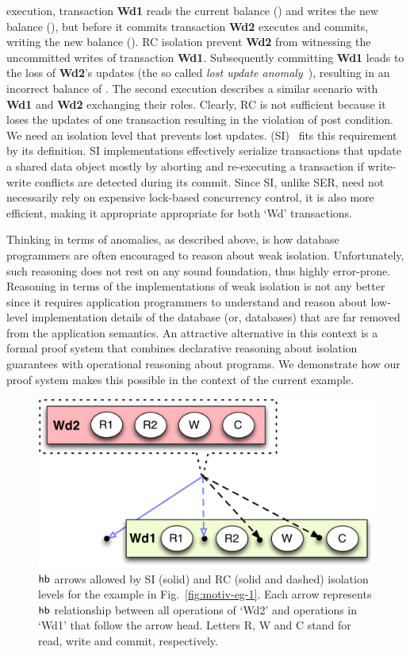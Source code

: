 execution, transaction {\bf Wd1} reads the current balance () and
writes the new balance (), but before it commits transaction
{\bf Wd2} executes and commits, writing the new balance (). RC
isolation prevent {\bf Wd2} from witnessing the uncommitted writes of
transaction {\bf Wd1}.  Subsequently committing {\bf Wd1} leads to the
loss of {\bf Wd2}'s updates (the so called \emph{lost update
anomaly}~\cite{berenson}), resulting in an incorrect balance of
. The second execution describes a similar scenario with {\bf
Wd1} and {\bf Wd2} exchanging their roles.  Clearly, RC is not
sufficient because it loses the updates of one transaction resulting
in the violation of post condition.  We need an isolation level that
prevents lost updates.   (SI)~\cite{berenson}
fits this requirement by its definition. SI implementations
effectively serialize transactions that update a shared data object
mostly by aborting and re-executing a transaction if write-write
conflicts are detected during its commit.  Since SI, unlike SER, need
not necessarily rely on expensive lock-based concurrency control, it
is also more efficient, making it appropriate appropriate for both
`Wd' transactions. 

Thinking in terms of anomalies, as described above, is how database
programmers are often encouraged to reason about weak isolation.
Unfortunately, such reasoning does not rest on any sound foundation,
thus highly error-prone. Reasoning in terms of the implementations of
weak isolation is not any better since it requires application
programmers to understand and reason about low-level implementation
details of the database (or, databases) that are far removed from the
application semantics. An attractive alternative in this context is a
formal proof system that combines declarative reasoning about
isolation guarantees with operational reasoning about programs. We
demonstrate how our proof system makes this possible in the context of
the current example.

\begin{figure}
\centering
  \includegraphics[scale=0.4]{Figures/motiv-eg-1-hb}

\label{fig:motiv-eg-1-hb}
\caption{$\textsf{hb}$ arrows allowed by SI (solid) and RC (solid and dashed)
isolation levels for the example in Fig.~\ref{fig:motiv-eg-1}. Each
arrow represents $\textsf{hb}$ relationship between all operations of `Wd2'
and operations in `Wd1' that follow the arrow head. Letters R, W and C
stand for read, write and commit, respectively.}
\end{figure}

